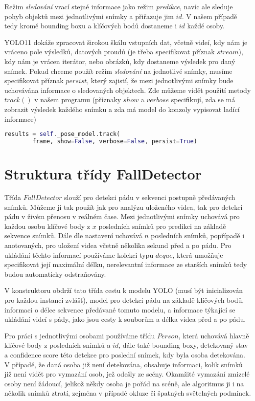 Režim \textit{sledování} vrací stejné informace jako režim \textit{predikce},
navíc ale sleduje pohyb objektů mezi jednotlivými snímky a přiřazuje jim $id$.
V našem případě tedy kromě bounding boxu a klíčových bodů dostaneme i $id$
každé osoby.

YOLO11 dokáže zpracovat širokou škálu vstupních dat, včetně videí, kdy nám je
vráceno pole výsledků, datových proudů (je třeba specifikovat příznak
$stream$), kdy nám je vrácen iterátor, nebo obrázků, kdy dostaneme výsledek pro
daný snímek. Pokud chceme použít režim \textit{sledování} na jednotlivé snímky,
musíme specifikovat příznak $persist$, který zajistí, že mezi jednotlivými
snímky bude uchovávána informace o sledovaných objektech. Zde můžeme vidět
použití metody $track()$ v našem programu (příznaky $show$ a $verbose$
specifikují, zda se má zobrazit výsledek každého snímku a zda má model do
konzoly vypisovat ladící informace)

\begin{lstlisting}[language=Python, label=src:params, caption={Použití sledování pomocí YOLO11}]
    results = self._pose_model.track(
        frame, show=False, verbose=False, persist=True)
\end{lstlisting}

\section{Struktura třídy FallDetector}

Třída $FallDetector$ slouží pro detekci pádu v sekvenci postupně předávaných
snímků. Můžeme ji tak použít jak pro analýzu uloženého videa, tak pro detekci
pádu v živém přenosu v reálném čase. Mezi jednotlivými snímky uchovává pro
každou osobu klíčové body z $x$ posledních snímků pro predikci na základě
sekvence snímků. Dále dle nastavení uchovává $n$ posledních snímků, popřípadě i
anotovaných, pro uložení videa včetně několika sekund před a po pádu. Pro
ukládání těchto informací používáme kolekci typu $deque$, která umožňuje
specifikovat její maximální délku, nerelevantní informace ze starších snímků
tedy budou automaticky odstraňovány.

V konstruktoru obdrží tato třída cestu k modelu YOLO (musí být inicializován
pro každou instanci zvlášť), model pro detekci pádu na základě klíčových bodů,
informaci o délce sekvence předávané tomuto modelu, a informace týkající se
ukládání videí s pády, jako jsou cesty k souborům a délka videa před a po pádu.

Pro práci s jednotlivými osobami používáme třídu $Person$, která uchovává
hlavně klíčové body z posledních snímků a $id$, dále také bounding boxy,
detekovaný stav a confidence score této detekce pro poslední snímek, kdy byla
osoba detekována. V případě, že daná osoba již není detekována, obsahuje
informaci, kolik snímků již není vidět pro vymazání osob, jež odešly ze scény.
Okamžité vymazání zmizelé osoby není žádoucí, jelikož někdy osoba je pořád na
scéně, ale algoritmus ji i na několik snímků ztratí, zejména v případě okluze
či špatných světelných podmínek.

